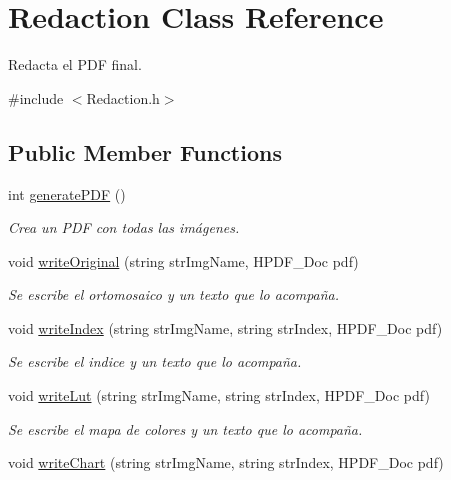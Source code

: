 \hypertarget{classRedaction}{}\section{Redaction Class Reference}
\label{classRedaction}


Redacta el P\+DF final.  




{\ttfamily \#include $<$Redaction.\+h$>$}

\subsection*{Public Member Functions}
\begin{DoxyCompactItemize}
\item 
int \mbox{\hyperlink{classRedaction_a4659115b2df63c9e0694c7f7cf325ff6}{generate\+P\+DF}} ()
\begin{DoxyCompactList}\small\item\em Crea un P\+DF con todas las imágenes. \end{DoxyCompactList}\item 
void \mbox{\hyperlink{classRedaction_a95d771b7dcd46c323876a0ad597d46e4}{write\+Original}} (string str\+Img\+Name, H\+P\+D\+F\+\_\+\+Doc pdf)
\begin{DoxyCompactList}\small\item\em Se escribe el ortomosaico y un texto que lo acompaña. \end{DoxyCompactList}\item 
void \mbox{\hyperlink{classRedaction_a5eb1526e3796eb6c1df1a78854d4f9d0}{write\+Index}} (string str\+Img\+Name, string str\+Index, H\+P\+D\+F\+\_\+\+Doc pdf)
\begin{DoxyCompactList}\small\item\em Se escribe el indice y un texto que lo acompaña. \end{DoxyCompactList}\item 
void \mbox{\hyperlink{classRedaction_a1b092fb88b89ca238da44111f6a67ddc}{write\+Lut}} (string str\+Img\+Name, string str\+Index, H\+P\+D\+F\+\_\+\+Doc pdf)
\begin{DoxyCompactList}\small\item\em Se escribe el mapa de colores y un texto que lo acompaña. \end{DoxyCompactList}\item 
void \mbox{\hyperlink{classRedaction_af897cc53c7d60685232fe19dd76d0d9f}{write\+Chart}} (string str\+Img\+Name, string str\+Index, H\+P\+D\+F\+\_\+\+Doc pdf)

\end{DoxyCompactItemize}

